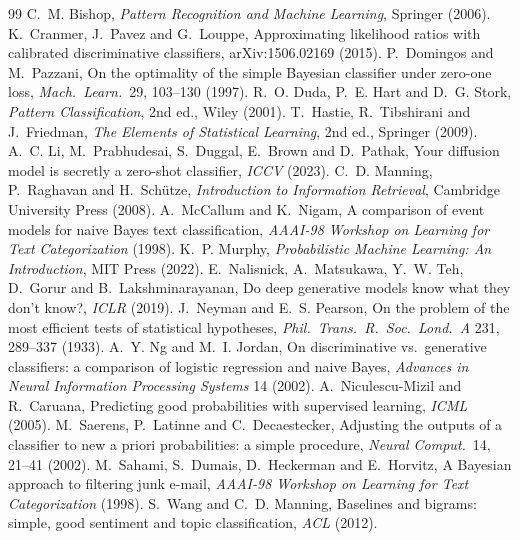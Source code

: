 \documentclass[11pt]{article}
\begin{document}
\begin{thebibliography}{99}\small
{} C.~M. Bishop, \emph{Pattern Recognition and Machine Learning}, Springer (2006).
 K.~Cranmer, J.~Pavez and G.~Louppe, Approximating likelihood ratios with calibrated discriminative classifiers, arXiv:1506.02169 (2015).
 P.~Domingos and M.~Pazzani, On the optimality of the simple Bayesian classifier under zero-one loss, \emph{Mach.\ Learn.}\ 29, 103--130 (1997).
 R.~O. Duda, P.~E. Hart and D.~G. Stork, \emph{Pattern Classification}, 2nd ed., Wiley (2001).
 T.~Hastie, R.~Tibshirani and J.~Friedman, \emph{The Elements of Statistical Learning}, 2nd ed., Springer (2009).
 A.~C. Li, M.~Prabhudesai, S.~Duggal, E.~Brown and D.~Pathak, Your diffusion model is secretly a zero-shot classifier, \emph{ICCV} (2023).
 C.~D. Manning, P.~Raghavan and H.~Sch\"utze, \emph{Introduction to Information Retrieval}, Cambridge University Press (2008).
 A.~McCallum and K.~Nigam, A comparison of event models for naive Bayes text classification, \emph{AAAI-98 Workshop on Learning for Text Categorization} (1998).
 K.~P. Murphy, \emph{Probabilistic Machine Learning: An Introduction}, MIT Press (2022).
 E.~Nalisnick, A.~Matsukawa, Y.~W. Teh, D.~Gorur and B.~Lakshminarayanan, Do deep generative models know what they don't know?, \emph{ICLR} (2019).
 J.~Neyman and E.~S. Pearson, On the problem of the most efficient tests of statistical hypotheses, \emph{Phil.\ Trans.\ R.\ Soc.\ Lond.\ A} 231, 289--337 (1933).
 A.~Y. Ng and M.~I. Jordan, On discriminative vs.\ generative classifiers: a comparison of logistic regression and naive Bayes, \emph{Advances in Neural Information Processing Systems} 14 (2002).
 A.~Niculescu-Mizil and R.~Caruana, Predicting good probabilities with supervised learning, \emph{ICML} (2005).
 M.~Saerens, P.~Latinne and C.~Decaestecker, Adjusting the outputs of a classifier to new a priori probabilities: a simple procedure, \emph{Neural Comput.}\ 14, 21--41 (2002).
 M.~Sahami, S.~Dumais, D.~Heckerman and E.~Horvitz, A Bayesian approach to filtering junk e-mail, \emph{AAAI-98 Workshop on Learning for Text Categorization} (1998).
 S.~Wang and C.~D. Manning, Baselines and bigrams: simple, good sentiment and topic classification, \emph{ACL} (2012).
\end{thebibliography}

\SourceNote
\end{document}
